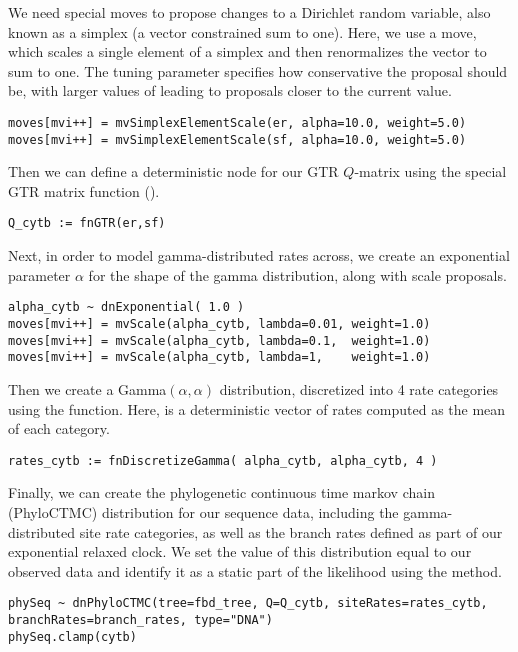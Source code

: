 We need special moves to propose changes to a Dirichlet random variable, also known as a simplex (a vector constrained sum to one).
Here, we use a  move, which scales a single element of a simplex and then renormalizes the vector to sum to one.
The tuning parameter  specifies how conservative the proposal should be, with larger values of  leading to proposals closer to the current value.
{\tt \begin{snugshade*}
\begin{lstlisting}
moves[mvi++] = mvSimplexElementScale(er, alpha=10.0, weight=5.0)
moves[mvi++] = mvSimplexElementScale(sf, alpha=10.0, weight=5.0)
\end{lstlisting}
\end{snugshade*}}

Then we can define a deterministic node for our GTR $Q$-matrix using the special GTR matrix function ().
{\tt \begin{snugshade*}
\begin{lstlisting}
Q_cytb := fnGTR(er,sf)
\end{lstlisting}
\end{snugshade*}}

Next, in order to model gamma-distributed rates across, we create an exponential parameter $\alpha$ for the shape of the gamma distribution, along with scale proposals.
{\tt \begin{snugshade*}
\begin{lstlisting}
alpha_cytb ~ dnExponential( 1.0 )
moves[mvi++] = mvScale(alpha_cytb, lambda=0.01, weight=1.0)
moves[mvi++] = mvScale(alpha_cytb, lambda=0.1,  weight=1.0)
moves[mvi++] = mvScale(alpha_cytb, lambda=1,    weight=1.0)
\end{lstlisting}
\end{snugshade*}}

Then we create a Gamma$(\alpha,\alpha)$ distribution, discretized into 4 rate categories using the  function.
Here,  is a deterministic vector of rates computed as the mean of each category.
{\tt \begin{snugshade*}
\begin{lstlisting}
rates_cytb := fnDiscretizeGamma( alpha_cytb, alpha_cytb, 4 )
\end{lstlisting}
\end{snugshade*}}

Finally, we can create the phylogenetic continuous time markov chain (PhyloCTMC) distribution for our sequence data, including the gamma-distributed site rate categories, as well as the branch rates defined as part of our exponential relaxed clock.
We set the value of this distribution equal to our observed data and identify it as a static part of the likelihood using the  method.
{\tt \begin{snugshade*}
\begin{lstlisting}
phySeq ~ dnPhyloCTMC(tree=fbd_tree, Q=Q_cytb, siteRates=rates_cytb, branchRates=branch_rates, type="DNA")
phySeq.clamp(cytb)
\end{lstlisting}
\end{snugshade*}}

